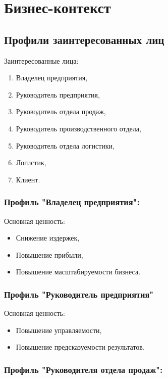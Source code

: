 \chapter{Бизнес-контекст}
\label{ch:chap4}


\section{Профили заинтересованных лиц}
\label{sec:stakeholders}

Заинтересованные лица:
\begin{enumerate}[label=\arabic*]
    \item Владелец предприятия,
    \item Руководитель предприятия,
    \item Руководитель отдела продаж,
    \item Руководитель производственного отдела,
    \item Руководитель отдела логистики,
    \item Логистик,
    \item Клиент.
\end{enumerate}

\subsection{Профиль "Владелец предприятия":}
\label{subsec:owner}

Основная ценность:
\begin{itemize}
    \item Снижение издержек,
    \item Повышение прибыли,
    \item Повышение масштабируемости бизнеса.
\end{itemize}

\subsection{Профиль "Руководитель предприятия"}
\label{subsec:manager}

Основная ценность:
\begin{itemize}
    \item Повышение управляемости,
    \item Повышение предсказуемости результатов.
\end{itemize}

\subsection{Профиль "Руководителя отдела продаж":}
\label{subsec:sale}


